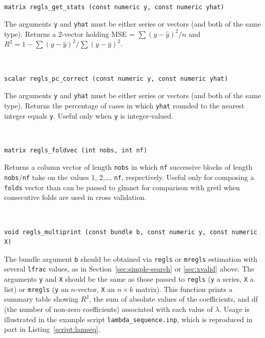 \documentclass{article}
\newenvironment{funcdoc}
{\noindent\hrulefill\\[-12pt]}
{\medbreak}
\begin{document}

\begin{funcdoc}
\begin{verbatim}
matrix regls_get_stats (const numeric y, const numeric yhat)
\end{verbatim}
  The arguments \texttt{y} and \texttt{yhat} must be either series or
  vectors (and both of the same type).  Returns a 2-vector
  holding MSE = $\sum(y - \hat{y})^2/n$ and
  $R^2 = 1 - \sum(y - \hat{y})^2/\sum(y - \bar{y})^2$.
\end{funcdoc}

\begin{funcdoc}
\begin{verbatim}
scalar regls_pc_correct (const numeric y, const numeric yhat)
\end{verbatim}
  The arguments \texttt{y} and \texttt{yhat} must be either series or
  vectors (and both of the same type).  Returns the percentage
  of cases in which \texttt{yhat} rounded to the nearest integer
  equals \texttt{y}. Useful only when \texttt{y} is integer-valued.
\end{funcdoc}

\begin{funcdoc}
\begin{verbatim}
matrix regls_foldvec (int nobs, int nf)
\end{verbatim}
  Returns a column vector of length \texttt{nobs} in which \texttt{nf}
  successive blocks of length \texttt{nobs}/\texttt{nf} take on the
  values 1, 2,\dots, \texttt{nf}, respectively. Useful only for
  composing a \texttt{folds} vector than can be passed to
  \textsf{glmnet} for comparison with gretl when consecutive folds are
  used in cross validation.
\end{funcdoc}

\begin{funcdoc}
\begin{verbatim}
void regls_multiprint (const bundle b, const numeric y, const numeric X)
\end{verbatim}
  The bundle argument \texttt{b} should be obtained via \texttt{regls}
  or \texttt{mregls} estimation with several \texttt{lfrac} values, as
  in Section~\ref{sec:simple-search} or \ref{sec:xvalid} above. The
  arguments \texttt{y} and \texttt{X} should be the same as those
  passed to \texttt{regls} (\texttt{y} a series, \texttt{X} a list) or
  \texttt{mregls} (\texttt{y} an $n$-vector, \texttt{X} an
  $n \times k$ matrix). This function prints a summary table showing
  $R^2$, the sum of absolute values of the coefficients, and df (the
  number of non-zero coefficients) associated with each value of
  $\lambda$. Usage is illustrated in the example script
  \texttt{lambda\_sequence.inp}, which is reproduced in part in
  Listing~\ref{script:lamseq}.
\end{funcdoc}
\end{document}
